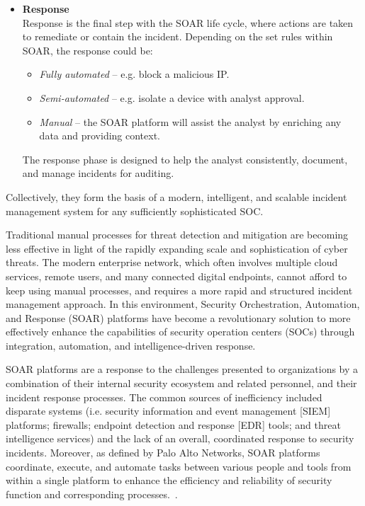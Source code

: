 \begin{itemize}
    \item \textbf{Response} \\
    Response is the final step with the SOAR life cycle, where actions are taken to remediate or contain the incident. Depending on the set rules within SOAR, the response could be:
    \begin{itemize}[noitemsep, topsep=0pt]
        \item \textit{Fully automated} – e.g. block a malicious IP.
        \item \textit{Semi-automated} – e.g. isolate a device with analyst approval.
        \item \textit{Manual} – the SOAR platform will assist the analyst by enriching any data and providing context.
    \end{itemize}
    The response phase is designed to help the analyst consistently, document, and manage incidents for auditing.
\end{itemize}

Collectively, they form the basis of a modern, intelligent, and scalable incident management system for any sufficiently sophisticated SOC.

Traditional manual processes for threat detection and mitigation are becoming less effective in light of the rapidly expanding scale and sophistication of cyber threats. The modern enterprise network, which often involves multiple cloud services, remote users, and many connected digital endpoints, cannot afford to keep using manual processes, and requires a more rapid and structured incident management approach. In this environment, Security Orchestration, Automation, and Response (SOAR) platforms have become a revolutionary solution to more effectively enhance the capabilities of security operation centers (SOCs) through integration, automation, and intelligence-driven response.

SOAR platforms are a response to the challenges presented to organizations by a combination of their internal security ecosystem and related personnel, and their incident response processes. The common sources of inefficiency included disparate systems (i.e. security information and event management [SIEM] platforms; firewalls; endpoint detection and response [EDR] tools; and threat intelligence services) and the lack of an overall, coordinated response to security incidents. Moreover, as defined by Palo Alto Networks, SOAR platforms coordinate, execute, and automate tasks between various people and tools from within a single platform to enhance the efficiency and reliability of security function and corresponding processes.~\cite{paloalto}.

